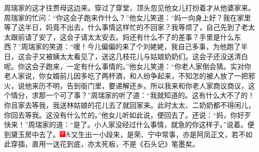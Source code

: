 周瑞家的这才往贾母这边来。穿过了穿堂，顶头忽见他女儿打扮着才从他婆家来。周瑞家的忙问：``你这会子跑来作什么？''他女儿笑道：``妈一向身上好？我在家里等了这半日，妈竟不出去，什么事情这样忙的不回家？我等烦了，自己先到了老太太跟前请了安了，这会子请太太安去。妈还有什么不了的差事？手里是什么东西？''周瑞家的笑道：``嗳！今儿偏偏的来了个刘姥姥，我自己多事，为他跑了半日，这会子又被姨太太看见了，送这几枝花儿与姑娘奶奶们。这会子还没送清白呢。你这会子跑来，一定有什么事情的。''他女儿笑道：``你老人家倒会猜。实对你老人家说，你女婿前儿因多吃了两杯酒，和人纷争起来，不知怎的被人放了一把邪火，说他来历不明，告到衙门里，要递解还乡。所以我来和你老人家商议商议，这个情分，求那一个可了事？''周瑞家的听了道：``我就知道的。这有什么大不了的！你且家去等我，我送林姑娘的花儿去了就回家来。此时太太、二奶奶都不得闲儿，你回去等我。这没有什么忙的。''他女儿听如此说，便回去了。还说：``妈，你好歹快来！''周瑞家的道：``是了。小人家没经过什么事情，就急的你这样子。''说着。便到黛玉房中去了。{\includegraphics[width=3mm]{../Images/00002}\includegraphics[width=3mm]{../Images/00012}\footnotesize \kaishu 又生出一小段来，是荣、宁中常事，亦是阿凤正文，若不如此穿插，直用一送花到底，亦太死板，不是《石头记》笔墨矣。}


